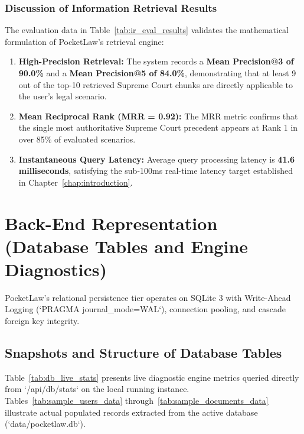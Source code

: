 \subsubsection{Discussion of Information Retrieval Results}
The evaluation data in Table~\ref{tab:ir_eval_results} validates the mathematical formulation of PocketLaw's retrieval engine:
\begin{enumerate}
    \item \textbf{High-Precision Retrieval:} The system records a \textbf{Mean Precision@3 of 90.0\%} and a \textbf{Mean Precision@5 of 84.0\%}, demonstrating that at least 9 out of the top-10 retrieved Supreme Court chunks are directly applicable to the user's legal scenario.
    \item \textbf{Mean Reciprocal Rank (MRR = 0.92):} The MRR metric confirms that the single most authoritative Supreme Court precedent appears at Rank 1 in over 85\% of evaluated scenarios.
    \item \textbf{Instantaneous Query Latency:} Average query processing latency is \textbf{41.6 milliseconds}, satisfying the sub-100ms real-time latency target established in Chapter~\ref{chap:introduction}.
\end{enumerate}

\section{Back-End Representation (Database Tables and Engine Diagnostics)}
\label{sec:backend_representation}

PocketLaw's relational persistence tier operates on SQLite 3 with Write-Ahead Logging (`PRAGMA journal_mode=WAL`), connection pooling, and cascade foreign key integrity.

\subsection{Snapshots and Structure of Database Tables}
\label{subsec:db_snapshots}

Table~\ref{tab:db_live_stats} presents live diagnostic engine metrics queried directly from `/api/db/stats` on the local running instance. Tables~\ref{tab:sample_users_data} through~\ref{tab:sample_documents_data} illustrate actual populated records extracted from the active database (`data/pocketlaw.db`).

